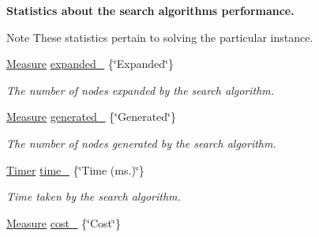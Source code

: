 \begin{Indent}{\bf Statistics about the search algorithm\textquotesingle{}s performance.}\par
{\em \begin{DoxyNote}{Note}
These statistics pertain to solving the particular instance. 
\end{DoxyNote}
}\begin{DoxyCompactItemize}
\item 
\hyperlink{structMeasure}{Measure} \hyperlink{structalgorithm_1_1Algorithm_ade53ec86bea2abe58fddfc5bb7f4653f}{expanded\+\_\+} \{\char`\"{}Expanded\char`\"{}\}\hypertarget{structalgorithm_1_1Algorithm_ade53ec86bea2abe58fddfc5bb7f4653f}{}\label{structalgorithm_1_1Algorithm_ade53ec86bea2abe58fddfc5bb7f4653f}

\begin{DoxyCompactList}\small\item\em The number of nodes expanded by the search algorithm. \end{DoxyCompactList}\item 
\hyperlink{structMeasure}{Measure} \hyperlink{structalgorithm_1_1Algorithm_a74e9a881f9b0b93129b0e349d425539d}{generated\+\_\+} \{\char`\"{}Generated\char`\"{}\}\hypertarget{structalgorithm_1_1Algorithm_a74e9a881f9b0b93129b0e349d425539d}{}\label{structalgorithm_1_1Algorithm_a74e9a881f9b0b93129b0e349d425539d}

\begin{DoxyCompactList}\small\item\em The number of nodes generated by the search algorithm. \end{DoxyCompactList}\item 
\hyperlink{structTimer}{Timer} \hyperlink{structalgorithm_1_1Algorithm_abec349e0d26ccd4dbc014c19114b0559}{time\+\_\+} \{\char`\"{}Time (ms.)\char`\"{}\}\hypertarget{structalgorithm_1_1Algorithm_abec349e0d26ccd4dbc014c19114b0559}{}\label{structalgorithm_1_1Algorithm_abec349e0d26ccd4dbc014c19114b0559}

\begin{DoxyCompactList}\small\item\em Time taken by the search algorithm. \end{DoxyCompactList}\item 
\hyperlink{structMeasure}{Measure} \hyperlink{structalgorithm_1_1Algorithm_aac9e60b0069aa91585e3c832484d328b}{cost\+\_\+} \{\char`\"{}Cost\char`\"{}\}\hypertarget{structalgorithm_1_1Algorithm_aac9e60b0069aa91585e3c832484d328b}{}\label{structalgorithm_1_1Algorithm_aac9e60b0069aa91585e3c832484d328b}


\end{DoxyCompactItemize}
\end{Indent}

